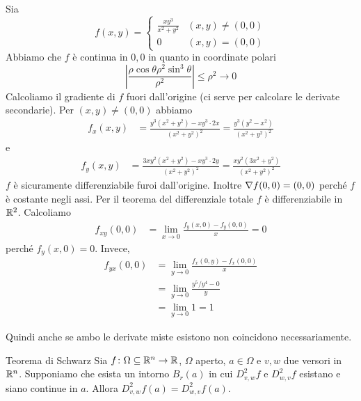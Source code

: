 \documentclass[a4paper]{article}
\begin{document}
\begin{radioactive}
\begin{snippetexample}{}
    Sia
    \[
        f(x,y) =\begin{cases}
            \frac{xy^3}{x^2 + y^2} & (x,y) \neq (0,0) \\
            0 & (x,y) = (0,0)
        \end{cases}
    \]
    Abbiamo che \(f\) è continua in \(0,0\)
    in quanto in coordinate polari
    \[
        \left|\frac{\rho \cos \theta \rho^2 \sin^3 \theta}{\rho^2}\right|
        \leq \rho^2 \to 0
    \]
    Calcoliamo il gradiente di \(f\) fuori dall'origine (ci serve per calcolare le derivate secondarie).
    Per \((x,y) \neq (0,0)\) abbiamo
    \begin{align*}
        f_x(x,y) &= \frac{y^3(x^2 + y^2) - xy^3 \cdot 2x}{{(x^2 + y^2)}^2}
        = \frac{y^3(y^2 - x^2)}{{(x^2 + y^2)}^2}
    \end{align*}
    e
    \begin{align*}
        f_y(x,y) &= \frac{3xy^2(x^2 + y^2) - xy^3 \cdot 2y}{{(x^2 + y^2)}^2}
        = \frac{xy^2(3x^2 + y^2)}{{(x^2 + y^2)}^2}
    \end{align*}
    \(f\) è sicuramente differenziabile furoi dall'origine.
    Inoltre \(\nabla f(0,0) = (0,0)\) perché \(f\) è costante
    negli assi. Per il teorema del differenziale totale \(f\)
    è differenziabile in \(\mathbb{R}^2\).
    Calcoliamo
    \begin{align*}
        f_{xy}(0,0) &= \lim_{x\to 0} \frac{f_y(x,0) - f_y(0,0)}{x} = 0
    \end{align*}
    perché \(f_y(x,0) = 0\).
    Invece,
    \begin{align*}
        f_{yx}(0,0) &= \lim_{y\to 0} \frac{f_x(0,y) - f_x(0,0)}{x}  \\
        &= \lim_{y\to 0} \frac{y^5 / y^4 - 0}{y} \\
        &= \lim_{y\to 0} 1 = 1
    \end{align*}
\end{snippetexample}
\end{radioactive}

\begin{radioactive}
Quindi anche se ambo le derivate miste esistono non coincidono necessariamente.

\begin{snippettheorem}{Teorema di Schwarz}
    Sia \(f \colon \Omega \subseteq \mathbb{R}^n \to \mathbb{R}\),
    \(\Omega\) aperto, \(a \in \Omega\) e \(v,w\) due versori in \(\mathbb{R}^n\).
    Supponiamo che esista un intorno \(B_r(a)\) in cui \(D^2_{v,w} f\)
    e \(D^2_{w,v}f\) esistano e siano continue in \(a\).
    Allora \(D^2_{v,w} f(a) = D^2_{w,v} f(a)\).
\end{snippettheorem}
\end{radioactive}
\end{document}
